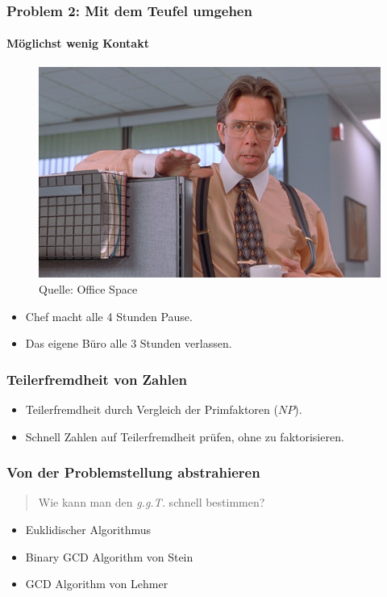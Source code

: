 \documentclass[•]{beamer}
\begin{document}
\begin{frame}
	\frametitle{Problem 2: Mit dem Teufel umgehen}
    \framesubtitle{M\"oglichst wenig Kontakt}
    \pause 
    \vspace*{10pt}
     \begin{figure}
	\centering
	\includegraphics[scale=0.17]{cicada}
	\caption*{\scriptsize{Quelle: Office Space}}
	\end{figure}
    \begin{itemize}
    \pause 
    \item Chef macht alle 4 Stunden Pause.
    \pause 
    \item Das eigene B\"uro alle 3 Stunden verlassen.
    \end{itemize}
\end{frame}

\begin{frame}
	\frametitle{Teilerfremdheit von Zahlen}
	\pause 
\begin{itemize}
\item Teilerfremdheit durch Vergleich der Primfaktoren ($NP$).
\pause 
\item Schnell Zahlen auf Teilerfremdheit pr\"ufen, ohne zu faktorisieren.
\end{itemize}
\end{frame}

\begin{frame}
\frametitle{Von der Problemstellung abstrahieren}
\pause 
\begin{quote}
		Wie kann man den \textit{g.g.T.} schnell bestimmen?
	\end{quote}
	\pause 
	\begin{itemize}
	\item Euklidischer Algorithmus
	\item Binary GCD Algorithm von Stein
	\item GCD Algorithm von Lehmer
	\end{itemize}
\end{frame}
\end{document}

